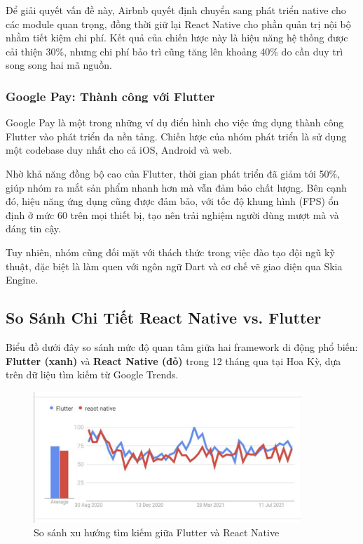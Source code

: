 \vspace{0.5em}

Để giải quyết vấn đề này, Airbnb quyết định chuyển sang phát triển native cho các module quan trọng,  
đồng thời giữ lại React Native cho phần quản trị nội bộ nhằm tiết kiệm chi phí. Kết quả của chiến lược này là hiệu năng hệ thống được cải thiện 30\%,  
nhưng chi phí bảo trì cũng tăng lên khoảng 40\% do cần duy trì song song hai mã nguồn.

\subsubsection{Google Pay: Thành công với Flutter}

Google Pay là một trong những ví dụ điển hình cho việc ứng dụng thành công Flutter vào phát triển đa nền tảng. Chiến lược của nhóm phát triển là sử dụng một codebase duy nhất cho cả iOS, Android và web.

\vspace{0.5em}

Nhờ khả năng đồng bộ cao của Flutter, thời gian phát triển đã giảm tới 50\%, giúp nhóm ra mắt sản phẩm nhanh hơn mà vẫn đảm bảo chất lượng. Bên cạnh đó, hiệu năng ứng dụng cũng được đảm bảo, với tốc độ khung hình (FPS) ổn định ở mức 60 trên mọi thiết bị, tạo nên trải nghiệm người dùng mượt mà và đáng tin cậy.

\vspace{0.5em}

Tuy nhiên, nhóm cũng đối mặt với thách thức trong việc đào tạo đội ngũ kỹ thuật,  
đặc biệt là làm quen với ngôn ngữ Dart và cơ chế vẽ giao diện qua Skia Engine.

\subsection{So Sánh Chi Tiết React Native vs. Flutter}
\renewcommand{\labelitemi}{--}    

    Biểu đồ dưới đây so sánh mức độ quan tâm giữa hai framework di động phổ biến: \textbf{Flutter (xanh)} và \textbf{React Native (đỏ)} trong 12 tháng qua tại Hoa Kỳ, dựa trên dữ liệu tìm kiếm từ Google Trends.

    \begin{figure}[H]
        \centering
        \includegraphics[width=0.9\textwidth]{images/reactNative_flutter.png}
        \caption{So sánh xu hướng tìm kiếm giữa Flutter và React Native \cite{goldenowlflutterreact}}
    \end{figure}

